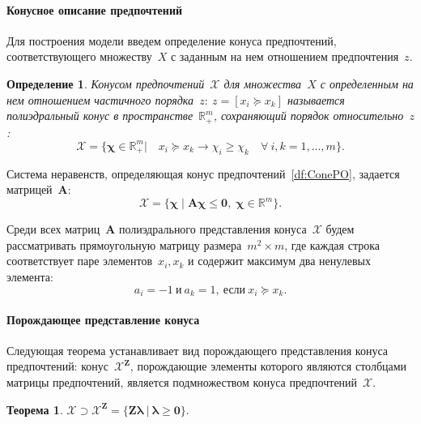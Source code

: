 \documentclass{elsarticle}
\newcommand{\bZ}{\mathbf{Z}}
\newcommand{\bA}{\mathbf{A}}
\newcommand{\bchi}{\boldsymbol{\chi}}
\newcommand{\bzeta}{\boldsymbol{\zeta}}
\newcommand{\blambda}{\boldsymbol{\lambda}}
\newcommand{\cX}{\mathcal{X}}
\newtheorem{theorem}{Теорема}%
\newtheorem{df}{Определение}
\begin{document}
\paragraph{Конусное описание предпочтений}

Для построения модели введем определение конуса предпочтений, соответствующего множеству~$X$ с заданным на нем отношением предпочтения~$z$.
\begin{df}
Конусом предпочтений~$\cX$ для множества~$X$ с определенным на нем отношением частичного порядка~$z:~z=[x_i \succeq x_k]$ называется полиэдральный конус в пространстве~$\mathbb{R}^m_+$, сохраняющий порядок относительно~$z$:
\[
\cX=\{\bchi\in\mathbb{R}^m_+|\quad x_i\succeq x_k\rightarrow \chi_{i}\geq \chi_{k}\quad \forall~i,k=1,...,m\}.
\]
\label{df:ConePO}
\end{df}
Система неравенств, определяющая конус предпочтений~\eqref{df:ConePO}, задается матрицей~$\bA$:
\[
\mathcal{X}=\{\bchi\;|\;\bA\bchi\leq \mathbf{0},\;\bchi\in\mathbb{R}^m\}.
\]

Среди всех матриц~$\bA$ полиэдрального представления конуса~$\cX$ будем рассматривать прямоугольную матрицу размера~$m^2\times m$, где каждая строка соответствует паре элементов~$x_{i}, x_{k}$ и содержит максимум два ненулевых элемента:
\[
a_i=-1~\text{и}~a_k=1,~\text{если}~x_{i}\succeq x_{k}.
\]

\paragraph{Порождающее представление конуса}
Следующая теорема устанавливает вид порождающего представления конуса предпочтений: конус~$\cX^{\bZ}$, порождающие элементы которого являются столбцами матрицы предпочтений, является подмножеством конуса предпочтений~$\cX$.
\begin{theorem}
\label{thm:ConeSubset}
$\cX \supset \cX^{\bZ}=\{\bZ\blambda~|~\blambda \geq \mathbf{0}\}.$
\end{theorem}

\end{document}
